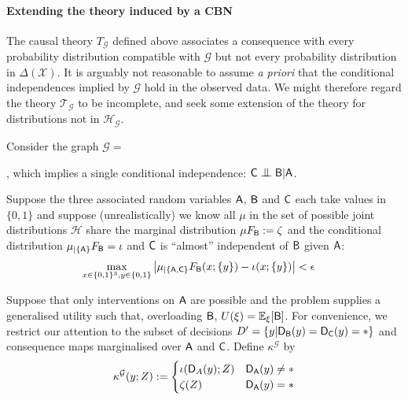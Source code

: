 \paragraph*{Extending the theory induced by a CBN} The causal theory $T_{\mathcal{G}}$ defined above associates a consequence with every probability distribution compatible with $\mathcal{G}$ but not every probability distribution in $\Delta(\mathcal{X})$. It is arguably not reasonable to assume \emph{a priori} that the conditional independences implied by $\mathcal{G}$ hold in the observed data. We might therefore regard the theory $\mathscr{T}_{\mathcal{G}}$ to be incomplete, and seek some extension of the theory for distributions not in $\mathcal{H}_{\mathcal{G}}$.

\begin{example}\label{ex:extn_cbn}

Consider the graph $\mathcal{G}=$, which implies a single conditional independence: $\RV{C}\CI \RV{B}|\RV{A}$.

Suppose the three associated random variables $\mathsf{A}$, $\mathsf{B}$ and $\mathsf{C}$ each take values in $\{0,1\}$ and suppose (unrealistically) we know all $\mu$ in the set of possible joint distributions $\mathscr{H}$ share the marginal distribution $\mu F_{\mathsf{B}} := \zeta$ and the conditional distribution $\mu_{|\{\mathsf{A}\}} F_{\mathsf{B}} = \iota$ and $\mathsf{C}$ is ``almost'' independent of $\mathsf{B}$ given $\mathsf{A}$:
\begin{align}
    \max_{x\in\{0,1\}^3,y\in\{0,1\}}\left|\mu_{|\{\mathsf{A},\mathsf{C}\}} F_{\mathsf{B}}(x;\{y\}) - \iota(x;\{y\}) \right| &< \epsilon \label{eq:app_ci}
\end{align}

Suppose that only interventions on $\mathsf{A}$ are possible and the problem supplies a generalised utility such that, overloading $\mathsf{B}$, $U(\xi)=\mathbb{E}_{\xi}[\mathsf{B}]$. For convenience, we restrict our attention to the subset of decisions $D'=\{y|\mathsf{D}_{\mathsf{B}}(y)=\mathsf{D}_{\mathsf{C}}(y)=*\}$ and consequence maps marginalised over $\mathsf{A}$ and $\mathsf{C}$. Define $\kappa^{\mathcal{G}}$ by
\begin{align}
    \kappa^{\mathcal{G}}(y;Z) := \begin{cases} \iota(\mathsf{D}_A(y);Z) & \mathsf{D}_{\mathsf{A}}(y) \neq *\\
                                              \zeta(Z) & \mathsf{D}_{\mathsf{A}}(y) = *\end{cases}
\end{align}


\end{example}
